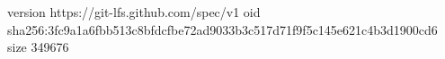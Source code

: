 version https://git-lfs.github.com/spec/v1
oid sha256:3fc9a1a6fbb513c8bfdcfbe72ad9033b3c517d71f9f5c145e621c4b3d1900cd6
size 349676
